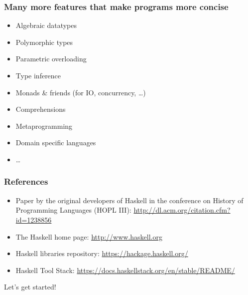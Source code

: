 \documentclass{beamer}
\begin{document}
\begin{frame}
  \frametitle{Many more features that make programs more concise}
  \begin{itemize}
  \item Algebraic datatypes
  \item Polymorphic types
  \item Parametric overloading
  \item Type inference
  \item Monads \& friends (for IO, concurrency, \dots)
  \item Comprehensions
  \item Metaprogramming
  \item Domain specific languages
  \item \dots
  \end{itemize}
\end{frame}
\begin{frame}
  \frametitle{References}
  \begin{itemize}
  \item Paper by the original developers of Haskell in the conference on History of
    Programming Languages (HOPL III): \href{A History
      of Haskell: Being Lazy with
      Class}{http://dl.acm.org/citation.cfm?id=1238856}
  \item The Haskell home page: \url{http://www.haskell.org}
  \item Haskell libraries repository:
    \url{https://hackage.haskell.org/}
  \item Haskell Tool Stack: \url{https://docs.haskellstack.org/en/stable/README/}
  \end{itemize}
\end{frame}


\begin{frame}
  \begin{center}
  \end{center}
\end{frame}


\begin{frame}
  \begin{Huge}
    \begin{center}
      Let's get started!
    \end{center}
  \end{Huge}
\end{frame}
\end{document}
